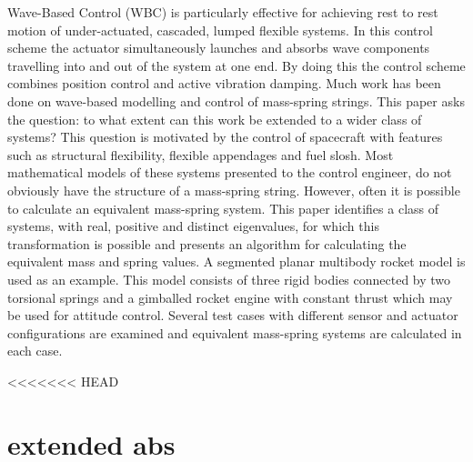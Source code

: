 \documentclass{mbd_fullpaper}
\begin{document}
Wave-Based Control (WBC) is particularly effective for achieving rest to rest motion of under-actuated, cascaded, lumped flexible systems. In this control scheme the actuator simultaneously launches and absorbs wave components travelling into and out of the system at one end. By doing this the control scheme combines position control and active vibration damping. Much work has been done on wave-based modelling and control of mass-spring strings. This paper asks the question: to what extent can this work be extended to a wider class of systems? This question is motivated by the control of spacecraft with features such as structural flexibility, flexible appendages and fuel slosh. Most mathematical models of these systems presented to the control engineer, do not obviously have the structure of a mass-spring string. However, often it is possible to calculate an equivalent mass-spring system. This paper identifies a class of systems, with real, positive and distinct eigenvalues, for which this transformation is possible and presents an algorithm for calculating the equivalent mass and spring values. A segmented planar multibody rocket model is used as an example. This model consists of three rigid bodies connected by two torsional springs and a gimballed rocket engine with constant thrust which may be used for attitude control. Several test cases with different sensor and actuator configurations are examined and equivalent mass-spring systems are calculated in each case.

<<<<<<< HEAD
\section{extended abs}
\end{document}
